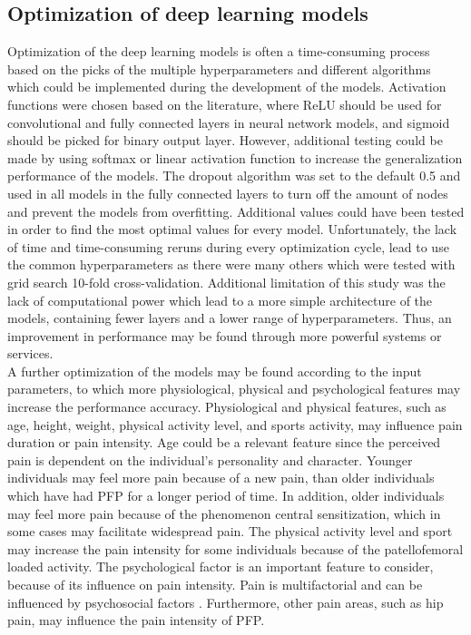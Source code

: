 \subsection{Optimization of deep learning models}
Optimization of the deep learning models is often a time-consuming process based on the picks of the multiple hyperparameters and different algorithms which could be implemented during the development of the models.
Activation functions were chosen based on the literature, where ReLU should be used for convolutional and fully connected layers in neural network models, and sigmoid should be picked for binary output layer. However, additional testing could be made by using softmax or linear activation function to increase the generalization performance of the models. The dropout algorithm was set to the default 0.5 and used in all models in the fully connected layers to turn off the amount of nodes and prevent the models from overfitting. Additional values could have been tested in order to find the most optimal values for every model.
Unfortunately, the lack of time and time-consuming reruns during every optimization cycle, lead to use the common hyperparameters as there were many others which were tested with grid search 10-fold cross-validation.
\noindent
Additional limitation of this study was the lack of computational power which lead to a more simple architecture of the models, containing fewer layers and a lower range of hyperparameters. Thus, an improvement in performance may be found through more powerful systems or services. \\
\noindent
A further optimization of the models may be found according to the input parameters, to which more physiological, physical and psychological features may increase the performance accuracy. Physiological and physical features, such as age, height, weight, physical activity level, and sports activity, may influence pain duration or pain intensity. Age could be a relevant feature since the perceived pain is dependent on the individual's personality and character. Younger individuals may feel more pain because of a new pain, than older individuals which have had PFP for a longer period of time. In addition, older individuals may feel more pain because of the phenomenon central sensitization, which in some cases may facilitate widespread pain. The physical activity level and sport may increase the pain intensity for some individuals because of the patellofemoral loaded activity. The psychological factor is an important feature to consider, because of its influence on pain intensity. Pain is multifactorial and can be influenced by psychosocial factors \citep{Roos2003}. Furthermore, other pain areas, such as hip pain, may influence the pain intensity of PFP.